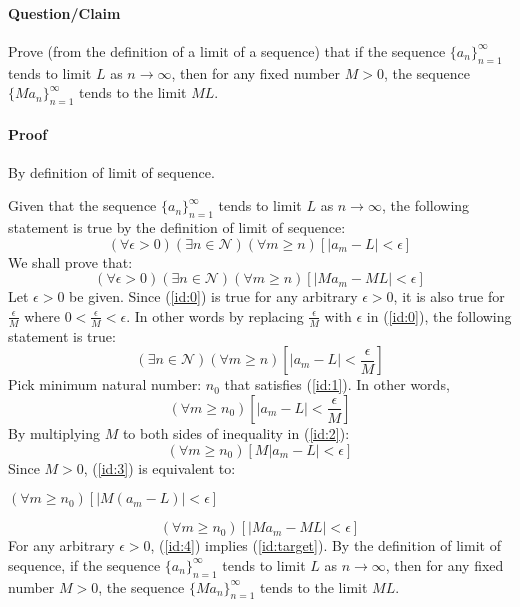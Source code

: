 \documentclass[14pt]{extarticle}
\begin{document}
	\paragraph{Question/Claim} Prove (from the definition of a limit of a sequence) that if the sequence $\{a_n\}_{n=1}^\infty$ tends to limit $L$ as $n \to\infty$, then for any fixed number $M>0$, the sequence $\{Ma_n\}_{n=1}^\infty$ tends to the limit $ML$.
	\paragraph{Proof} By definition of limit of sequence.
	\par\bigskip
	Given that the sequence $\{a_n\}_{n=1}^\infty$ tends to limit $L$ as $n \to\infty$, the following statement is true by the definition of limit of sequence:
	\begin{equation}\label{id:0}
	(\forall \epsilon > 0)(\exists n \in \mathcal{N})(\forall m \ge n)[|a_m -L| < \epsilon]
	\end{equation}
	  We shall prove that:
	\begin{equation}\label{id:target}
	(\forall \epsilon > 0)(\exists n \in \mathcal{N})(\forall m \ge n)[|Ma_m -ML| < \epsilon]
	\end{equation}
	Let $\epsilon > 0$ be given.  Since (\ref{id:0}) is true for any arbitrary $\epsilon > 0$, it is also true for $\frac{\epsilon}{M}$ where $0< \frac{\epsilon}{M} < \epsilon$.  In other words by replacing $\frac{\epsilon}{M}$ with $\epsilon$ in (\ref{id:0}), the following statement is true:
	\begin{equation}\label{id:1}
	(\exists n \in \mathcal{N})(\forall m \ge n)[|a_m -L| < \frac{\epsilon}{M}]
	\end{equation}
	Pick minimum natural number: $n_0$ that satisfies (\ref{id:1}).  In other words,
	\begin{equation}\label{id:2}
	(\forall m \ge n_0)[|a_m -L| < \frac{\epsilon}{M}]
	\end{equation}
	By multiplying $M$ to both sides of inequality in (\ref{id:2}):
	\begin{equation}\label{id:3}
	(\forall m \ge n_0)[M|a_m -L| < {\epsilon}]
	\end{equation}
	Since $M > 0$, (\ref{id:3}) is equivalent to:
	\begin{center}
	$(\forall m \ge n_0)[|M(a_m -L)| < {\epsilon}]$
	\end{center}
	\begin{equation}\label{id:4}
	(\forall m \ge n_0)[|Ma_m -ML| < {\epsilon}]
	\end{equation}
	For any arbitrary $\epsilon > 0$, (\ref{id:4}) implies (\ref{id:target}).  By the definition of limit of sequence, if the sequence $\{a_n\}_{n=1}^\infty$ tends to limit $L$ as $n \to\infty$, then for any fixed number $M>0$, the sequence $\{Ma_n\}_{n=1}^\infty$ tends to the limit $ML$.
\end{document}

